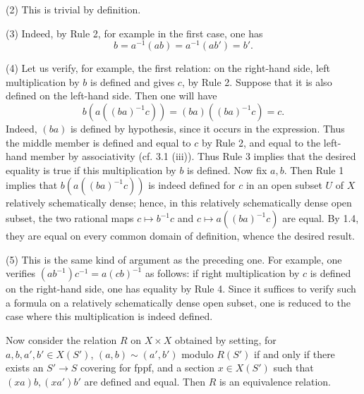 (2) This is trivial by definition.

(3) Indeed, by Rule 2, for
example in the first case,
one has
\[
b=a^{-1}(ab)=a^{-1}(ab')=b'.
\]

(4) Let us verify, for example,
the first relation:
on the right-hand side,
left multiplication by \(b\)
is defined and gives \(c\),
by Rule 2.
Suppose that it is also
defined on the left-hand side.
Then one will have
\[
b(a((ba)^{-1}c))=(ba)((ba)^{-1}c)=c.
\]
Indeed, \((ba)\) is defined
by hypothesis, since it occurs
in the expression.
Thus the middle member is
defined and equal to \(c\)
by Rule 2, and equal to
the left-hand member by
associativity (cf. 3.1 (iii)).
Thus Rule 3 implies that
the desired equality is true
if this multiplication by
\(b\) is defined.
Now fix \(a,b\).
Then Rule 1 implies that
\(b(a((ba)^{-1}c))\) is indeed
defined for \(c\) \og in\fg{}
an open subset \(U\) of \(X\)
relatively schematically dense;
hence, in this relatively
schematically dense open subset,
the two rational maps
\(c\mapsto b^{-1}c\) and
\(c\mapsto a((ba)^{-1}c)\)
are equal.
By 1.4, they are equal on
every common domain of
definition, whence the desired result.

(5) This is the same kind
of argument as the preceding one.
For example, one verifies
\((ab^{-1})c^{-1}=a(cb)^{-1}\)
as follows:
if right multiplication by
\(c\) is defined on the
right-hand side, one has
equality by Rule 4.
Since it suffices to verify
such a formula on a relatively
schematically dense open subset,
one is reduced to the case
where this multiplication is
indeed defined.

\label{XVIII.3.2.3}
Now consider the relation
\(R\) on \(X\times X\)
obtained by setting, for
\(a,b,a',b'\in X(S')\),
\((a,b)\sim(a',b')\) modulo
\(R(S')\) if and only if
there exists an \(S'\to S\)
covering for fppf, and a
section \(x\in X(S')\) such
that \((xa)b,(xa')b'\) are
defined and equal.
Then \(R\) is an equivalence relation.

